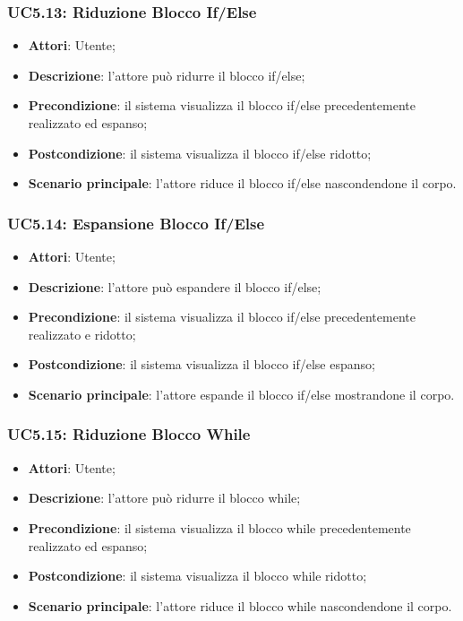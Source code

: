 \subsubsection{UC5.13: Riduzione Blocco If/Else}
\label{UC5.13}
\begin{itemize}
\item \textbf{Attori}: Utente;
\item \textbf{Descrizione}: l'attore può ridurre il blocco if/else;	
\item \textbf{Precondizione}: il sistema visualizza il blocco if/else precedentemente realizzato ed espanso;	
\item \textbf{Postcondizione}: il sistema visualizza il blocco if/else ridotto;	
\item \textbf{Scenario principale}:
l'attore riduce il blocco if/else nascondendone il corpo.	
\end{itemize}

\subsubsection{UC5.14: Espansione Blocco If/Else	}
\label{UC5.14}
\begin{itemize}
\item \textbf{Attori}: Utente;
\item \textbf{Descrizione}: l'attore può espandere il blocco if/else;	
\item \textbf{Precondizione}: il sistema visualizza il blocco if/else precedentemente realizzato e ridotto;	
\item \textbf{Postcondizione}: il sistema visualizza il blocco if/else espanso;	
\item \textbf{Scenario principale}:
l'attore espande il blocco if/else mostrandone il corpo.	
\end{itemize}

\subsubsection{UC5.15: Riduzione Blocco While}
\label{UC5.15}
\begin{itemize}
\item \textbf{Attori}: Utente;
\item \textbf{Descrizione}: l'attore può ridurre il blocco while;	
\item \textbf{Precondizione}: il sistema visualizza il blocco while precedentemente realizzato ed espanso;	
\item \textbf{Postcondizione}: il sistema visualizza il blocco while ridotto;	
\item \textbf{Scenario principale}:
l'attore riduce il blocco while nascondendone il corpo.	
\end{itemize}

